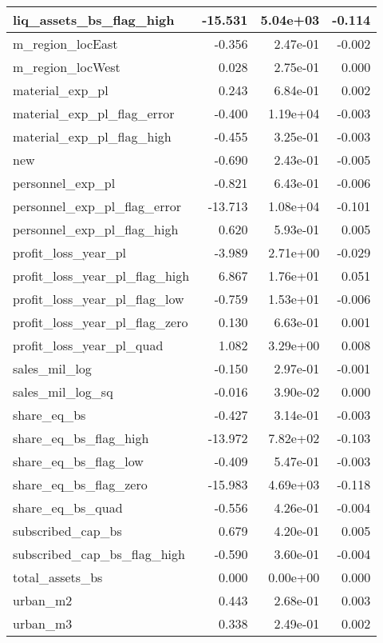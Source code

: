 \begin{table}
\begin{tabular}[t]{l|r|r|r}
\hline
liq\_assets\_bs\_flag\_high & -15.531 & 5.04e+03 & -0.114\\
\hline
m\_region\_locEast & -0.356 & 2.47e-01 & -0.002\\
\hline
m\_region\_locWest & 0.028 & 2.75e-01 & 0.000\\
\hline
material\_exp\_pl & 0.243 & 6.84e-01 & 0.002\\
\hline
material\_exp\_pl\_flag\_error & -0.400 & 1.19e+04 & -0.003\\
\hline
material\_exp\_pl\_flag\_high & -0.455 & 3.25e-01 & -0.003\\
\hline
new & -0.690 & 2.43e-01 & -0.005\\
\hline
personnel\_exp\_pl & -0.821 & 6.43e-01 & -0.006\\
\hline
personnel\_exp\_pl\_flag\_error & -13.713 & 1.08e+04 & -0.101\\
\hline
personnel\_exp\_pl\_flag\_high & 0.620 & 5.93e-01 & 0.005\\
\hline
profit\_loss\_year\_pl & -3.989 & 2.71e+00 & -0.029\\
\hline
profit\_loss\_year\_pl\_flag\_high & 6.867 & 1.76e+01 & 0.051\\
\hline
profit\_loss\_year\_pl\_flag\_low & -0.759 & 1.53e+01 & -0.006\\
\hline
profit\_loss\_year\_pl\_flag\_zero & 0.130 & 6.63e-01 & 0.001\\
\hline
profit\_loss\_year\_pl\_quad & 1.082 & 3.29e+00 & 0.008\\
\hline
sales\_mil\_log & -0.150 & 2.97e-01 & -0.001\\
\hline
sales\_mil\_log\_sq & -0.016 & 3.90e-02 & 0.000\\
\hline
share\_eq\_bs & -0.427 & 3.14e-01 & -0.003\\
\hline
share\_eq\_bs\_flag\_high & -13.972 & 7.82e+02 & -0.103\\
\hline
share\_eq\_bs\_flag\_low & -0.409 & 5.47e-01 & -0.003\\
\hline
share\_eq\_bs\_flag\_zero & -15.983 & 4.69e+03 & -0.118\\
\hline
share\_eq\_bs\_quad & -0.556 & 4.26e-01 & -0.004\\
\hline
subscribed\_cap\_bs & 0.679 & 4.20e-01 & 0.005\\
\hline
subscribed\_cap\_bs\_flag\_high & -0.590 & 3.60e-01 & -0.004\\
\hline
total\_assets\_bs & 0.000 & 0.00e+00 & 0.000\\
\hline
urban\_m2 & 0.443 & 2.68e-01 & 0.003\\
\hline
urban\_m3 & 0.338 & 2.49e-01 & 0.002\\
\hline
\end{tabular}
\end{table}